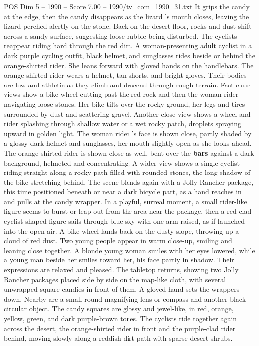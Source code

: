 \begin{textsample}{POS Dim 5 – 1990 – Score 7.00 – 1990/tv\_com\_1990\_31.txt}
It grips the candy at the edge, then the candy disappears as the lizard ’s mouth closes, leaving the lizard perched alertly on the stone.
Back on the desert floor, rocks and dust shift across a sandy surface, suggesting loose rubble being disturbed.
The cyclists reappear riding hard through the red dirt.
A woman-presenting adult cyclist in a dark purple cycling outfit, black helmet, and sunglasses rides beside or behind the orange-shirted rider.
She leans forward with gloved hands on the handlebars.
The orange-shirted rider wears a helmet, tan shorts, and bright gloves.
Their bodies are low and athletic as they climb and descend through rough terrain.
Fast close views show a bike wheel cutting past the red rock and then the woman rider navigating loose stones.
Her bike tilts over the rocky ground, her legs and tires surrounded by dust and scattering gravel.
Another close view shows a wheel and rider splashing through shallow water or a wet rocky patch, droplets spraying upward in golden light.
The woman rider ’s face is shown close, partly shaded by a glossy dark helmet and sunglasses, her mouth slightly open as she looks ahead.
The orange-shirted rider is shown close as well, bent over the \textbf{bars} against a dark background, helmeted and concentrating.
A wider view shows a single cyclist riding straight along a rocky path filled with rounded stones, the long shadow of the bike stretching behind.
The scene blends again with a Jolly Rancher package, this time positioned beneath or near a dark bicycle part, as a hand reaches in and pulls at the candy wrapper.
In a playful, surreal moment, a small rider-like figure seems to burst or leap out from the area near the package, then a red-clad cyclist-shaped figure sails through blue sky with one arm raised, as if launched into the open air.
A bike wheel lands back on the dusty slope, throwing up a cloud of red dust.
Two young people appear in warm close-up, smiling and leaning close together.
A blonde young woman smiles with her eyes lowered, while a young man beside her smiles toward her, his face partly in shadow.
Their expressions are relaxed and pleased.
The tabletop returns, showing two Jolly Rancher packages placed side by side on the map-like cloth, with several unwrapped square candies in front of them.
A gloved hand sets the wrappers down.
Nearby are a small round magnifying lens or compass and another black circular object.
The candy squares are glossy and jewel-like, in red, orange, yellow, green, and dark purple-brown tones.
The cyclists ride together again across the desert, the orange-shirted rider in front and the purple-clad rider behind, moving slowly along a reddish dirt path with sparse desert shrubs.

\end{textsample}
